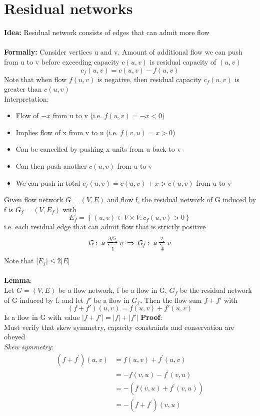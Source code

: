 \documentclass{article}[18pt]
\begin{document}
\section{Residual networks}
\textbf{Idea:} Residual network consists of edges that can admit more flow\\
\\
\textbf{Formally:} Consider vertices u and v. Amount of additional flow we can push from u to v before exceeding capacity $c(u,v)$ is residual capacity of $(u,v)$
$$c_f(u,v)  = c(u,v) - f(u,v)$$
Note that when flow $f(u,v)$ is negative, then residual capacity $c_f(u,v)$ is greater than $c(u,v)$\\
Interpretation:
\begin{itemize}
	\item Flow of $-x$ from u to v (i.e. $f(u,v)=-x<0$)
	\item Implies flow of x from v to u (i.e. $f(v,u)=x>0$)
	\item Can be cancelled by pushing x units from u back to v
	\item Can then push another $c(u,v)$ from u to v
	\item We can push in total $c_f(u,v)=c(u,v)+x>c(u,v)$ from u to v
\end{itemize}
Given flow network $G=(V,E)$ and flow f, the residual network of G induced by f is $G_f=(V,E_f)$ with
\[
E_{f}=\left\{(u, v) \in V \times V: c_{f}(u, v)>0\right\}
\]
i.e. each residual edge that can admit flow that is strictly positive
$$G: \ u\xrightleftharpoons[1]{3/5} v \ \Rightarrow \ G_f: \ u\xrightleftharpoons[4]{2} v$$
Note that $|E_f| \leqslant 2|E|$\\
\\
\textbf{Lemma}:\\
Let $G=(V,E)$ be a flow network, f be a flow in G, $G_f$ be the residual network of G induced by f, and let $f'$ be a flow in $G_f$. Then the flow sum $f+f'$ with
$$(f+f')(u,v)=f(u,v)+f'(u,v)$$
Is a flow in G with value $|f+f'|=|f|+|f'|$
\textbf{Proof}:\\
Must verify that skew symmetry, capacity constraints and conservation are obeyed\\
\textit{Skew symmetry}:
\[
\begin{aligned}
\left(f+f^{\prime}\right)(u, v) &=f(u, v)+f^{\prime}(u, v) \\
&=-f(v, u)-f^{\prime}(v, u) \\
&=-\left(f(v, u)+f^{\prime}(v, u)\right) \\
&=-\left(f+f^{\prime}\right)(v, u)
\end{aligned}
\]
\end{document}
